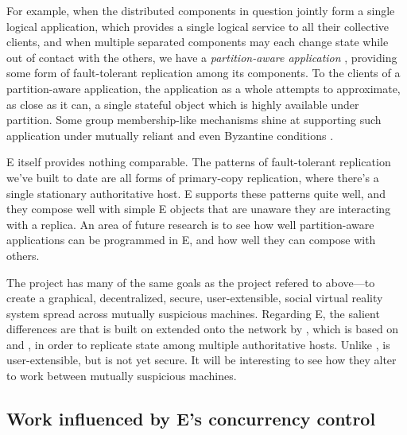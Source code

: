 \documentclass{llncs}
\begin{document}
For example, when the distributed components in question jointly form
a single logical application, which provides a single logical service
to all their collective clients, and when multiple separated
components may each change state while out of contact with the others,
we have a \emph{partition-aware application}
\cite{partition-aware,bancomat}, providing some form of fault-tolerant
replication among its components. To the clients of a partition-aware
application, the application as a whole attempts to approximate, as
close as it can, a single stateful object which is highly available
under partition. Some group membership-like mechanisms shine at
supporting such application under mutually reliant and even Byzantine
conditions \cite{castro:bft}.

E itself provides nothing comparable. The patterns of fault-tolerant
replication we've built to date are all forms of primary-copy
replication, where there's a single stationary authoritative host. E
supports these patterns quite well, and they compose well with simple
E objects that are unaware they are interacting with a replica. An
area of future research is to see how well partition-aware
applications can be programmed in E, and how well they can compose
with others.

 The  project has
many of the same goals as the  project refered to
above---to create a graphical, decentralized, secure, user-extensible,
social virtual reality system spread across mutually suspicious
machines. Regarding E, the salient differences are that 
is built on  extended onto the network by
, which is based on  \cite{reed:namos} and
 \cite{lamport:paxos}, in order to replicate state among
multiple authoritative hosts. Unlike ,  is
user-extensible, but is not yet secure. It will be interesting to see
how they alter  to work between mutually suspicious
machines.

\subsection{Work influenced by E's concurrency control}
\end{document}
